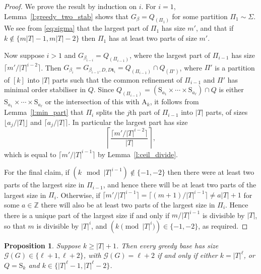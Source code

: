 \documentclass[twoside,a4paper,reqno,11pt]{amsart}
\newcommand{\A}{\mathrm{A}}
\newcommand{\<}{\langle}
\renewcommand{\>}{\rangle}
\newcommand{\geqs}{\geqslant}
\newcommand{\Sn}{\mathrm{S}}
\newcommand{\An}{\mathrm{A}}
\newtheorem{prop}[thm]{Proposition}
\theoremstyle{definition}
\begin{document}
\begin{proof}
We prove the result by induction on $i$. 
For $i = 1$,  Lemma~\ref{l:greedy_two_stab} shows that $G_{\beta} = Q_{(\Pi_1)}$
for some partition $\Pi_1 \sim \Sigma$. We see from \eqref{eq:sigma} that the largest part of $\Pi_1$ has size $m'$, 
and that if $k \not\in \{m|T|-1, m|T|-2\}$ then $\Pi_1$ has at least two parts of size $m'$.

Now suppose $i > 1$ and $G_{\beta_{i-i}} = Q_{(\Pi_{i-1})}$, where  %
the  
largest part of $\Pi_{i-1}$ has size $\lceil m'/|T|^{i-2} \rceil$. %
Then $G_{\beta_i} = G_{\beta_{i-1},D,D\mathbf{t}_i} = Q_{(\Pi_{i-1})} \cap Q_{(\Pi')}$, where $\Pi'$ is a partition of $[k]$ into $|T|$ parts such that the common refinement of $\Pi_{i-1}$ and $\Pi'$ has minimal order stabiliser in $Q$. %
Since $Q_{(\Pi_{i-1})} =  (\Sn_{a_1} \times \cdots \times \Sn_{a_\ell}) \cap Q$ is %
either $\Sn_{a_1} \times \cdots \times \Sn_{a_\ell}$ or the intersection of this with $\A_k$, it follows from Lemma~\ref{l:min_part} that $\Pi_i$ splits the $j$th part of $\Pi_{i-1}$ into $|T|$ parts, of sizes $\lfloor a_j/|T| \rfloor$ and $\lceil a_j/|T| \rceil$. In particular the largest part has size 
\[\left \lceil \frac{\lceil m'/|T|^{i-2} \rceil}{|T|} \right \rceil,\] which is equal to $\lceil m'/ |T|^{i-1} \rceil$ by Lemma~\ref{l:ceil_divide}. 

For the final claim, if $(k \mod |T|^{i-1}) \not\in \{-1, -2\}$ then there were at least two parts of the largest size in $\Pi_{i-1}$, and hence there will be at least two parts of the largest size in $\Pi_{i}$. Otherwise, if $\lceil m'/|T|^{i-1} \rceil  = \lceil (m+1)/|T|^{i-1} \rceil \neq a|T| + 1$ for some $a \in \mathbb{Z}$ there will also be at least two parts of the largest size in $\Pi_{i}$. Hence there is a unique part of the largest size if and only if $m/|T|^{i-1}$ is divisible by $|T|$, so that $m$ is divisible by $|T|^{i}$, and $(k \pmod{|T|^i}) \in \{-1, -2\}$, as required.
\end{proof}




\begin{prop}\label{p:|T|+1}
    Suppose $k\geqs |T|+1$. Then every greedy base has size $\mathcal{G}(G) \in \{\ell + 1, \ell + 2\}$, with $\mathcal{G}(G) = \ell + 2$ if and only if either $k = |T|^{\ell}$, or $Q = \Sn_k$ and $k \in \{ |T|^{\ell}-1, |T|^{\ell}-2\}$. 
\end{prop}
\end{document}
